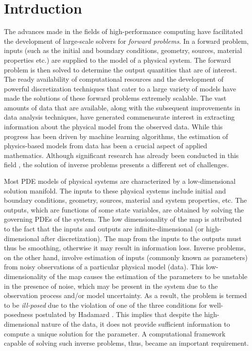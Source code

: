 \chapter{Intrduction}
\label{chapter:introduction}

The advances made in the fields of high-performance computing have facilitated the development of large-scale solvers for \textit{forward problems}. In a forward problem, inputs (such as the initial and boundary conditions, geometry, sources, material properties etc.) are supplied to the model of a physical system. The forward problem is then solved to determine the output quantities that are of interest. The ready availability of computational resources and the development of powerful discretization techniques that cater to a large variety of models have made the solutions of these forward problems extremely scalable. The vast amounts of data that are available, along with the subsequent improvements in data analysis techniques, have generated commensurate interest in extracting information about the physical model from the observed data. While this progress has been driven by machine learning algorithms, the estimation of physics-based models from data has been a crucial aspect of applied mathematics. Although significant research has already been conducted in this field \cite{banks2012estimation, sullivan2015introduction}, the solution of inverse problems presents a different set of challenges.

Most PDE models of physical systems are characterized by a low-dimensional solution manifold. The inputs to these physical systems include initial and boundary conditions, geometry, sources, material and system properties, etc. The outputs, which are functions of some state variables, are obtained by solving the governing PDEs of the system. The low dimensionality of the map is attributed to the fact that the inputs and outputs are infinite-dimensional (or high-dimensional after discretization). The map from the inputs to the outputs must thus be smoothing, otherwise it may result in information loss. Inverse problems, on the other hand, involve estimation of inputs (commonly known as parameters) from noisy observations of a particular physical model (data). This low-dimensionality of the map causes the estimation of the parameters to be unstable in the presence of noise, which may be present in the system due to the observation process and/or model uncertainty. As a result, the problem is termed to be \textit{ill-posed} due to the violation of one of the three conditions for well-posedness postulated by Hadamard \cite{hadamard1923lectures}. This implies that despite the high-dimensional nature of the data, it does not provide sufficient information to compute a unique solution for the parameter. A computational framework capable of solving such inverse problems, thus, became an important requirement.

